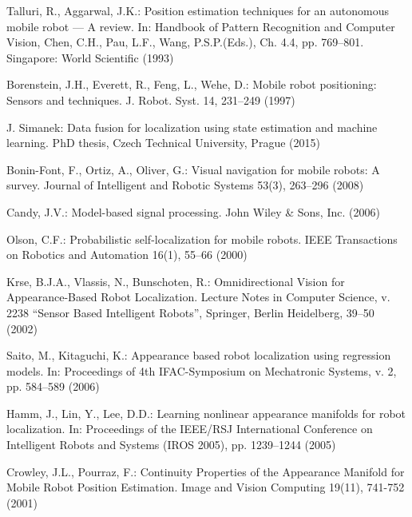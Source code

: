 \documentclass[conference]{IEEEtran} %
\begin{document}
\begin{thebibliography}{100}

Talluri, R., Aggarwal, J.K.: Position estimation techniques for an autonomous mobile robot --- A review. In: Handbook of Pattern Recognition and Computer Vision, Chen, C.H., Pau, L.F., Wang, P.S.P.(Eds.), Ch. 4.4, pp. 769--801. Singapore: World Scientific (1993)

Borenstein, J.H., Everett, R., Feng, L., Wehe, D.: Mobile robot positioning: Sensors and techniques. J. Robot. Syst. 14, 231--249 (1997)

J. Simanek: Data fusion for localization using state estimation and machine learning. PhD thesis, Czech Technical University, Prague (2015)

Bonin-Font, F., Ortiz, A., Oliver, G.: Visual navigation for mobile robots: A survey. Journal of Intelligent and Robotic Systems 53(3), 263–296 (2008)

Candy, J.V.: Model-based signal processing. John Wiley \& Sons, Inc. (2006)

Olson, C.F.: Probabilistic self-localization for mobile robots. IEEE Transactions on Robotics and Automation 16(1), 55--66 (2000)

Krse, B.J.A., Vlassis, N., Bunschoten, R.: Omnidirectional Vision for Appearance-Based Robot Localization. Lecture Notes in Computer Science, v. 2238 ``Sensor Based Intelligent Robots'', Springer, Berlin Heidelberg, 39--50 (2002)

Saito, M., Kitaguchi, K.: Appearance based robot localization using regression models. In: Proceedings of 4th IFAC-Symposium on Mechatronic Systems, v. 2, pp. 584--589 (2006)

Hamm, J., Lin, Y., Lee, D.D.: Learning nonlinear appearance manifolds for robot localization. In: Proceedings of the IEEE/RSJ International Conference on Intelligent Robots and Systems (IROS 2005), pp. 1239--1244 (2005)

Crowley, J.L., Pourraz, F.: Continuity Properties of the Appearance Manifold for Mobile Robot Position Estimation. Image and Vision Computing 19(11), 741-752 (2001)


\end{thebibliography}
\end{document}
